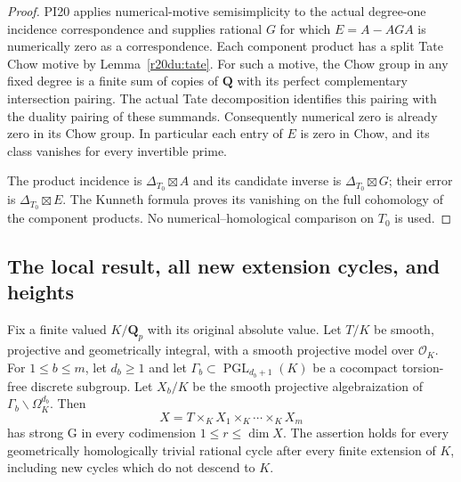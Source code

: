 \begin{proof}
PI20 applies numerical-motive semisimplicity to the actual
degree-one incidence correspondence and supplies rational $G$
for which $E=A-AGA$ is numerically zero as a correspondence.
Each component product has a split Tate Chow motive by
Lemma~\ref{r20du:tate}.  For such a motive, the Chow group in any
fixed degree is a finite sum of copies of $\mathbf Q$ with its
perfect complementary intersection pairing.  The actual Tate
decomposition identifies this pairing with the duality pairing
of these summands.  Consequently numerical zero is already zero
in its Chow group.  In particular each entry of $E$ is zero in
Chow, and its class vanishes for every invertible prime.

The product incidence is $\Delta_{T_0}\boxtimes A$ and its
candidate inverse is $\Delta_{T_0}\boxtimes G$; their error is
$\Delta_{T_0}\boxtimes E$.  The Kunneth formula proves its
vanishing on the full cohomology of the component products.
No numerical--homological comparison on $T_0$ is used.
\end{proof}

\subsection{The local result, all new extension cycles, and heights}

\begin{theorem}
\label{r20du:local}
Fix a finite valued $K/\mathbf Q_p$ with its original absolute value.
Let $T/K$ be smooth, projective and geometrically integral, with a
smooth projective model over $\mathcal O_K$.  For
$1\leq b\leq m$, let $d_b\geq1$ and let
$\Gamma_b\subset\operatorname{PGL}_{d_b+1}(K)$ be a cocompact
torsion-free discrete subgroup.  Let $X_b/K$ be the smooth
projective algebraization of
$\Gamma_b\backslash\Omega_K^{d_b}$.
Then
\[
 X=T\times_K X_1\times_K\cdots\times_K X_m
 \tag{DU20.4}\label{r20du:generic}
\]
has strong G in every codimension $1\leq r\leq\dim X$.
The assertion holds for every geometrically homologically trivial
rational cycle after every finite extension of $K$, including new
cycles which do not descend to $K$.
\end{theorem}

